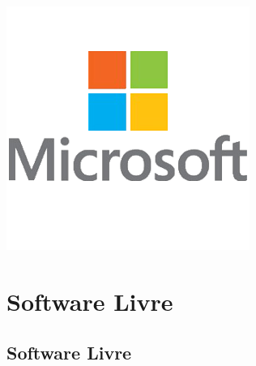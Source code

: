 \documentclass[xcolor=dvipsnames]{beamer}
\begin{document}
\begin{frame}
     \hspace{0.15cm}\includegraphics[scale=0.19]{microsoft.png}
\end{frame}




\section{Software Livre}
\subsection{Software Livre}
\end{document}
